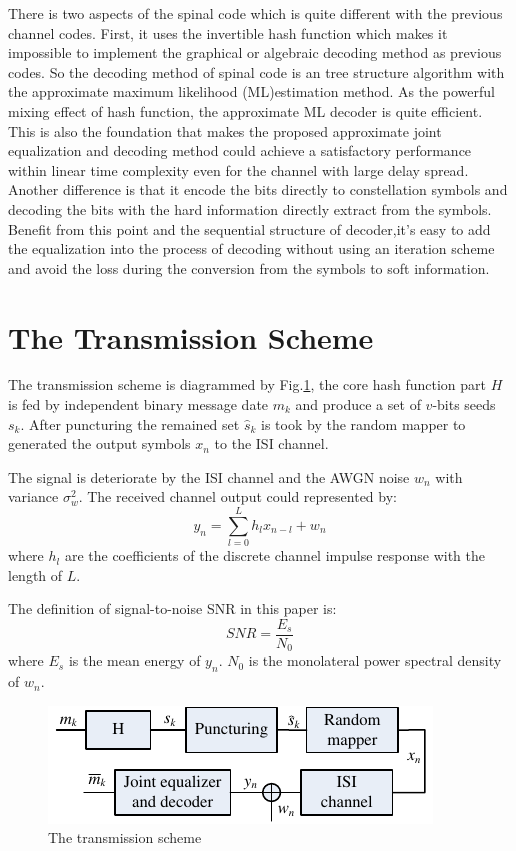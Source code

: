 \documentclass[conference]{IEEEtran}
\begin{document}
There is two aspects of the spinal code which is quite different with the previous channel codes. First, it uses the invertible hash function which makes it impossible to  implement the graphical or algebraic decoding method as previous codes. So the decoding method of spinal code is an tree structure algorithm with the approximate maximum likelihood (ML)estimation method. As the powerful mixing effect of hash function, the approximate ML decoder is quite efficient. This is also the foundation that makes the proposed approximate joint equalization and decoding method could achieve a satisfactory performance within linear time complexity even for the channel with large delay spread.  
Another difference is that it encode the bits directly to constellation symbols and decoding the bits with the hard information directly extract from the symbols. Benefit from this point and the sequential structure of decoder,it's easy to add the equalization into the process of decoding without using an iteration scheme and avoid the loss during the conversion from the symbols to soft information.  
\section{The Transmission Scheme}
The transmission scheme is diagrammed by Fig.\ref{fig_tranScheme}, the core hash function part $H$ is fed by independent binary message date $m_k$ and produce a set of $v$-bits seeds $s_k$. After puncturing the remained set $\widehat{s}_k$ is took by the random mapper to generated the output symbols $x_n$ to the ISI channel. 

The signal is deteriorate by the ISI channel and the AWGN noise $w_n$ with variance $\sigma^2_w$. The received channel output could represented by:
\begin{equation}
y_n=\sum_{l=0}^Lh_lx_{n-l}+w_n 
\label{equ_yn}
\end{equation}
where $h_l$ are the coefficients of the discrete channel impulse response with the length of $L$. 

The definition of signal-to-noise SNR in this paper is:
\begin{equation}
SNR=\frac{E_s}{N_0}
\label{equ_snr}
\end{equation}
where $E_s$ is the mean energy of $y_n$. $N_0$ is the monolateral power spectral density of $w_n$.
\begin{figure}[!t]
\centering
\includegraphics[width=3.0 in]{tranScheme.pdf}
\caption{The transmission scheme}
\label{fig_tranScheme}
\end{figure}
\end{document}
